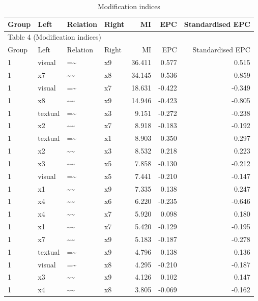 \documentclass[11pt]{article}
\begin{document}
\small
\begin{longtable}{llllrrr}
\caption{Modification indices}\\
\toprule
Group & Left & Relation & Right & MI & EPC & Standardised EPC \\
\midrule
\endfirsthead
\multicolumn{7}{l}{Table 4 (Modification indices)} \\
\toprule
Group & Left & Relation & Right & MI & EPC & Standardised EPC \\
\midrule
\endhead
1 & visual & =\textasciitilde{} & x9 & 36.411 & 0.577 & 0.515 \\
1 & x7 & \textasciitilde{}\textasciitilde{} & x8 & 34.145 & 0.536 & 0.859 \\
1 & visual & =\textasciitilde{} & x7 & 18.631 & -0.422 & -0.349 \\
1 & x8 & \textasciitilde{}\textasciitilde{} & x9 & 14.946 & -0.423 & -0.805 \\
1 & textual & =\textasciitilde{} & x3 & 9.151 & -0.272 & -0.238 \\
1 & x2 & \textasciitilde{}\textasciitilde{} & x7 & 8.918 & -0.183 & -0.192 \\
1 & textual & =\textasciitilde{} & x1 & 8.903 & 0.350 & 0.297 \\
1 & x2 & \textasciitilde{}\textasciitilde{} & x3 & 8.532 & 0.218 & 0.223 \\
1 & x3 & \textasciitilde{}\textasciitilde{} & x5 & 7.858 & -0.130 & -0.212 \\
1 & visual & =\textasciitilde{} & x5 & 7.441 & -0.210 & -0.147 \\
1 & x1 & \textasciitilde{}\textasciitilde{} & x9 & 7.335 & 0.138 & 0.247 \\
1 & x4 & \textasciitilde{}\textasciitilde{} & x6 & 6.220 & -0.235 & -0.646 \\
1 & x4 & \textasciitilde{}\textasciitilde{} & x7 & 5.920 & 0.098 & 0.180 \\
1 & x1 & \textasciitilde{}\textasciitilde{} & x7 & 5.420 & -0.129 & -0.195 \\
1 & x7 & \textasciitilde{}\textasciitilde{} & x9 & 5.183 & -0.187 & -0.278 \\
1 & textual & =\textasciitilde{} & x9 & 4.796 & 0.138 & 0.136 \\
1 & visual & =\textasciitilde{} & x8 & 4.295 & -0.210 & -0.187 \\
1 & x3 & \textasciitilde{}\textasciitilde{} & x9 & 4.126 & 0.102 & 0.147 \\
1 & x4 & \textasciitilde{}\textasciitilde{} & x8 & 3.805 & -0.069 & -0.162 \\

\end{longtable}
\end{document}
